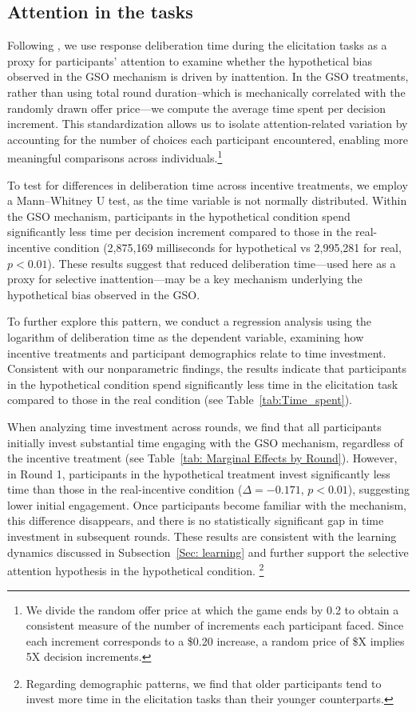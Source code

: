 \documentclass[12pt]{article}
\begin{document}
\subsection{Attention in the tasks}
\label{Sec: Attention}

Following \citet{chabris2008measuring}, we use response deliberation time during the elicitation tasks as a proxy for participants’ attention to examine whether the hypothetical bias observed in the GSO mechanism is driven by inattention. In the GSO treatments, rather than using total round duration--which is mechanically correlated with the randomly drawn offer price—we compute the average time spent per decision increment. This standardization allows us to isolate attention-related variation by accounting for the number of choices each participant encountered, enabling more meaningful comparisons across individuals.\footnote{We divide the random offer price at which the game ends by 0.2 to obtain a consistent measure of the number of increments each participant faced. Since each increment corresponds to a \$0.20 increase, a random price of \$X implies 5X decision increments.}

To test for differences in deliberation time across incentive treatments, we employ a Mann–Whitney U test, as the time variable is not normally distributed. Within the GSO mechanism, participants in the hypothetical condition spend significantly less time per decision increment compared to those in the real-incentive condition (2,875,169 milliseconds for hypothetical vs 2,995,281 for real, \(p < 0.01\)). 
These results suggest that reduced deliberation time—used here as a proxy for selective inattention—may be a key mechanism underlying the hypothetical bias observed in the GSO.

To further explore this pattern, we conduct a regression analysis using the logarithm of deliberation time as the dependent variable, examining how incentive treatments and participant demographics relate to time investment. Consistent with our nonparametric findings, the results indicate that participants in the hypothetical condition spend significantly less time in the elicitation task compared to those in the real condition (see  Table~\ref{tab:Time_spent}).

When analyzing time investment across rounds, we find that all participants initially invest substantial time engaging with the GSO mechanism, regardless of the incentive treatment (see Table~\ref{tab: Marginal Effects by Round}). However, in Round 1, participants in the hypothetical treatment invest significantly less time than those in the real-incentive condition (\(\Delta = -0.171\), \(p < 0.01\)), suggesting lower initial engagement. Once participants become familiar with the mechanism, this difference disappears, and there is no statistically significant gap in time investment in subsequent rounds. These results are consistent with the learning dynamics discussed in Subsection~\ref{Sec: learning} and further support the selective attention hypothesis in the hypothetical condition.
\footnote{Regarding demographic patterns, we find that older participants tend to invest more time in the elicitation tasks than their younger counterparts.}
\end{document}
